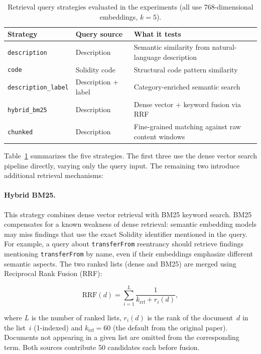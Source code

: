 \begin{table}[!ht]
\centering
\small
\begin{tabular}{llp{5.5cm}}
\toprule
\textbf{Strategy} & \textbf{Query source} & \textbf{What it tests} \\
\midrule
\texttt{description} & Description & Semantic similarity from natural-language description \\
\texttt{code} & Solidity code & Structural code pattern similarity \\
\texttt{description\_label} & Description + label & Category-enriched semantic search \\
\texttt{hybrid\_bm25} & Description & Dense vector + keyword fusion via RRF \\
\texttt{chunked} & Description & Fine-grained matching against raw content windows \\
\bottomrule
\end{tabular}
\caption[Retrieval query strategies.]{Retrieval query strategies evaluated in the experiments (all use 768-dimensional embeddings, $k{=}5$).}
\label{tab:query-strategies}
\end{table}

Table~\ref{tab:query-strategies} summarizes the five strategies. The first three use the dense vector search pipeline directly, varying only the query input. The remaining two introduce additional retrieval mechanisms:

\paragraph{Hybrid BM25.} This strategy combines dense vector retrieval with BM25 keyword search. BM25 compensates for a known weakness of dense retrieval: semantic embedding models may miss findings that use the exact Solidity identifier mentioned in the query. For example, a query about \texttt{transferFrom} reentrancy should retrieve findings mentioning \texttt{transferFrom} by name, even if their embeddings emphasize different semantic aspects. The two ranked lists (dense and BM25) are merged using Reciprocal Rank Fusion (RRF):

\begin{equation}
    \text{RRF}(d) = \sum_{i=1}^{L} \frac{1}{k_{\text{rrf}} + r_i(d)},
    \label{eq:rrf}
\end{equation}

where $L$ is the number of ranked lists, $r_i(d)$ is the rank of the document~$d$ in the list~$i$ (1-indexed) and $k_{\text{rrf}} = 60$ (the default from the original paper). Documents not appearing in a given list are omitted from the corresponding term. Both sources contribute 50 candidates each before fusion.

